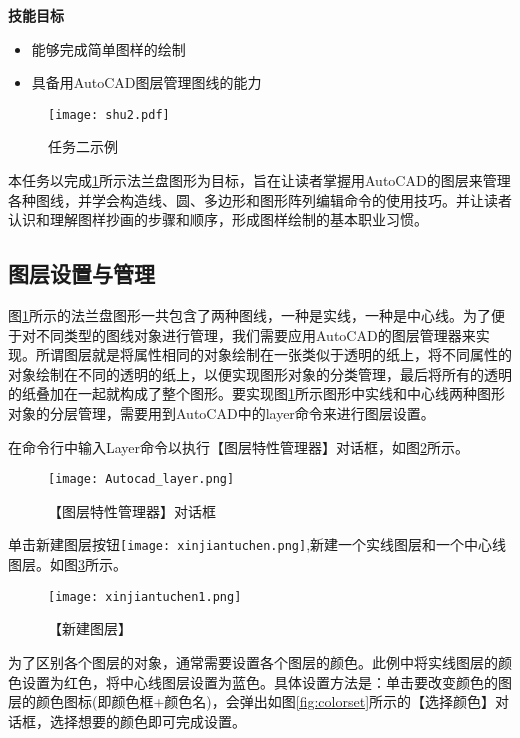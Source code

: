 {\bfseries 技能目标}
\begin{itemize}
\item 能够完成简单图样的绘制
\item 具备用AutoCAD图层管理图线的能力
\end{itemize}

\noindent
\begin{figure}[htbp]
\centering
\texttt{[image: shu2.pdf]}
\caption{任务二示例}\label{fig:renwu2}
\end{figure}

\indent
本任务以完成\ref{fig:renwu2}所示法兰盘图形为目标，旨在让读者掌握用AutoCAD的图层来管理各种图线，并学会构造线、圆、多边形和图形阵列编辑命令的使用技巧。并让读者认识和理解图样抄画的步骤和顺序，形成图样绘制的基本职业习惯。

\subsection{图层设置与管理}
图\ref{fig:renwu2}所示的法兰盘图形一共包含了两种图线，一种是实线，一种是中心线。为了便于对不同类型的图线对象进行管理，我们需要应用AutoCAD的图层管理器来实现。所谓图层就是将属性相同的对象绘制在一张类似于透明的纸上，将不同属性的对象绘制在不同的透明的纸上，以便实现图形对象的分类管理，最后将所有的透明的纸叠加在一起就构成了整个图形。要实现图\ref{fig:renwu2}所示图形中实线和中心线两种图形对象的分层管理，需要用到AutoCAD中的layer命令来进行图层设置。

在命令行中输入Layer命令以执行【图层特性管理器】对话框，如图\ref{fig:tuchenguanliqi}所示。

\begin{figure}[htbp]
\centering
\texttt{[image: Autocad\_layer.png]}
\caption{【图层特性管理器】对话框}\label{fig:tuchenguanliqi}
\end{figure}

单击新建图层按钮\texttt{[image: xinjiantuchen.png]},新建一个实线图层和一个中心线图层。如图\ref{fig:xinjiantuchen}所示。
\begin{figure}[htbp]
\centering
\texttt{[image: xinjiantuchen1.png]}
\caption{【新建图层】}\label{fig:xinjiantuchen}
\end{figure}

为了区别各个图层的对象，通常需要设置各个图层的颜色。此例中将实线图层的颜色设置为红色，将中心线图层设置为蓝色。具体设置方法是：单击要改变颜色的图层的颜色图标(即颜色框+颜色名)，会弹出如图\ref{fig:colorset}所示的【选择颜色】对话框，选择想要的颜色即可完成设置。

